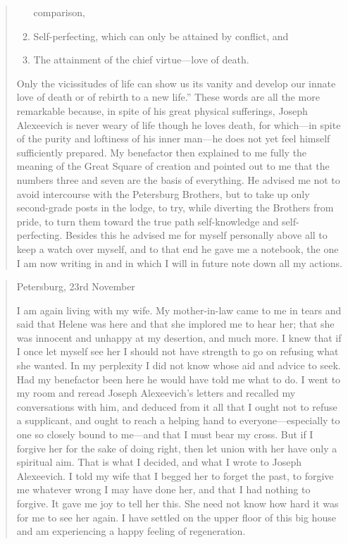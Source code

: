 \begin{quote}
\begin{enumerate}
  comparison,
\item Self-perfecting, which can only be attained by conflict,
  and
\item The attainment of the chief virtue---love of death.
\end{enumerate}
Only the vicissitudes of life can show us its vanity and develop
our innate love of death or of rebirth to a new life.'' These
words are all the more remarkable because, in spite of his great
physical sufferings, Joseph Alexeevich is never weary of life
though he loves death, for which---in spite of the purity and
loftiness of his inner man---he does not yet feel himself
sufficiently prepared. My benefactor then explained to me fully
the meaning of the Great Square of creation and pointed out to me
that the numbers three and seven are the basis of everything. He
advised me not to avoid intercourse with the Petersburg Brothers,
but to take up only second-grade posts in the lodge, to try,
while diverting the Brothers from pride, to turn them toward the
true path self-knowledge and self-perfecting. Besides this he
advised me for myself personally above all to keep a watch over
myself, and to that end he gave me a notebook, the one I am now
writing in and in which I will in future note down all my
actions.
\end{quote}

\begin{quote} \calli
Petersburg, 23rd November

I am again living with my wife. My mother-in-law came to me in
tears and said that Helene was here and that she implored me to
hear her; that she was innocent and unhappy at my desertion, and
much more. I knew that if I once let myself see her I should not
have strength to go on refusing what she wanted. In my perplexity
I did not know whose aid and advice to seek. Had my benefactor
been here he would have told me what to do. I went to my room and
reread Joseph Alexeevich's letters and recalled my conversations
with him, and deduced from it all that I ought not to refuse a
supplicant, and ought to reach a helping hand to
everyone---especially to one so closely bound to me---and that I
must bear my cross.  But if I forgive her for the sake of doing
right, then let union with her have only a spiritual aim. That is
what I decided, and what I wrote to Joseph Alexeevich. I told my
wife that I begged her to forget the past, to forgive me whatever
wrong I may have done her, and that I had nothing to forgive. It
gave me joy to tell her this. She need not know how hard it was
for me to see her again. I have settled on the upper floor of
this big house and am experiencing a happy feeling of
regeneration.
\end{quote}


